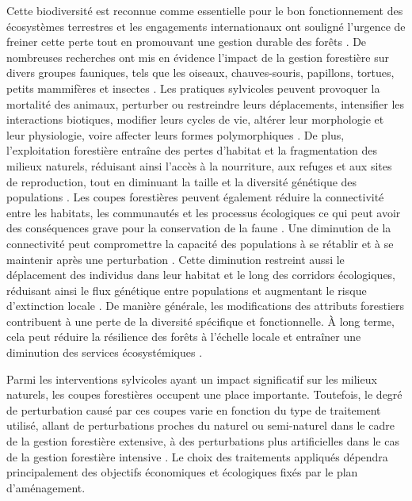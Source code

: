 Cette biodiversité est reconnue comme essentielle pour le bon fonctionnement des écosystèmes terrestres et les engagements internationaux ont souligné l'urgence de freiner cette perte tout en promouvant une gestion durable des forêts \citep{Scherer-Lorenzen2005ForestDiversity,Parviainen2007Maintenanceconservation,Newbold2015Globaleffects}. 
De nombreuses recherches ont mis en évidence l'impact de la gestion forestière sur divers groupes fauniques, tels que les oiseaux, chauves-souris, papillons, tortues, petits mammifères et insectes \citep{Summerville2011Managingforest, Currylow2012ShortTermForest, Kaminski2013EffectsForest, Kellner2013Shorttermresponses, Caldwell2019ComparisonBat}. 
Les pratiques sylvicoles peuvent provoquer la mortalité des animaux, perturber ou restreindre leurs déplacements, intensifier les interactions biotiques, modifier leurs cycles de vie, altérer leur morphologie et leur physiologie, voire affecter leurs formes polymorphiques \citep{Sergio2018Animalresponses}. 
De plus, l'exploitation forestière entraîne des pertes d'habitat et la fragmentation des milieux naturels, réduisant ainsi l'accès à la nourriture, aux refuges et aux sites de reproduction, tout en diminuant la taille et la diversité génétique des populations \citep{Bouderbala2023Longtermeffect}.
Les coupes forestières peuvent également réduire la connectivité entre les habitats, les communautés et les processus écologiques ce qui peut avoir des conséquences grave pour la conservation de la faune \citep{Lindenmayer2006Generalmanagement}. 
Une diminution de la connectivité peut compromettre la capacité des populations à se rétablir et à se maintenir après une perturbation \citep{Lamberson1994ReserveDesign}. 
Cette diminution restreint aussi le déplacement des individus dans leur habitat et le long des corridors écologiques, réduisant ainsi le flux génétique entre populations et augmentant le risque d'extinction locale \citep{Saccheri1998Inbreedingextinction}.
De manière générale, les modifications des attributs forestiers contribuent à une perte de la diversité spécifique et fonctionnelle. 
À long terme, cela peut réduire la résilience des forêts à l'échelle locale et entraîner une diminution des services écosystémiques \citep{Hooper2012globalsynthesis,Edwards2014Maintainingecosystem}. 

Parmi les interventions sylvicoles ayant un impact significatif sur les milieux naturels, les coupes forestières occupent une place importante. 
Toutefois, le degré de perturbation causé par ces coupes varie en fonction du type de traitement utilisé, allant de perturbations proches du naturel ou semi-naturel dans le cadre de la gestion forestière extensive, à des perturbations plus artificielles dans le cas de la gestion forestière intensive \citep{Ameray2021Forestcarbon}. 
Le choix des traitements appliqués dépendra principalement des objectifs économiques et écologiques fixés par le plan d'aménagement.

